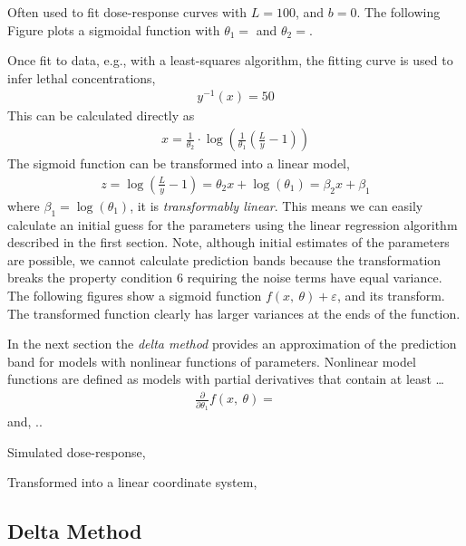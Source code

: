 \documentclass[11pt,a4paper]{article}
\begin{document}
Often used to fit dose-response curves with \(L = 100\), and \(b = 0\).
The following Figure plots a sigmoidal function with \(\theta_{1} =\)
and \(\theta_{2} =\).


Once fit to data, e.g., with a least-squares algorithm, the fitting
curve is used to infer lethal concentrations,
\begin{align}
y^{- 1}(x) = 50
\end{align}
This can be calculated directly as
\begin{align}
x = \frac{1}{\theta_{2}} \cdot \log\left( \frac{1}{\theta_{1}}\left( \frac{L}{y} - 1 \right) \right)
\end{align}
The sigmoid function can be transformed into a linear model,
\begin{align}
z = \log\left( \frac{L}{y} - 1 \right) = \theta_{2}x + \log(\theta_{1}) = \beta_{2}x + \beta_{1}
\end{align}
where \(\beta_{1} = \log{(\theta_{1})}\), it is \emph{transformably
linear}. This means we can easily calculate an initial guess for the
parameters using the linear regression algorithm described in the first
section. Note, although initial estimates of the parameters are
possible, we cannot calculate prediction bands because the
transformation breaks the property condition 6 requiring the noise terms
have equal variance. The following figures show a sigmoid function
\(f(x,\ \theta) + \varepsilon\), and its transform. The transformed
function clearly has larger variances at the ends of the function.

In the next section the \emph{delta method} provides an approximation of
the prediction band for models with nonlinear functions of parameters.
Nonlinear model functions are defined as models with partial derivatives
that contain at least \ldots{}
\begin{align}
\frac{\partial}{\partial\theta_{1}}f(x,\ \theta) =
\end{align}
and, ..

Simulated dose-response,


Transformed into a linear coordinate system,


\subsection{Delta Method}
\end{document}
